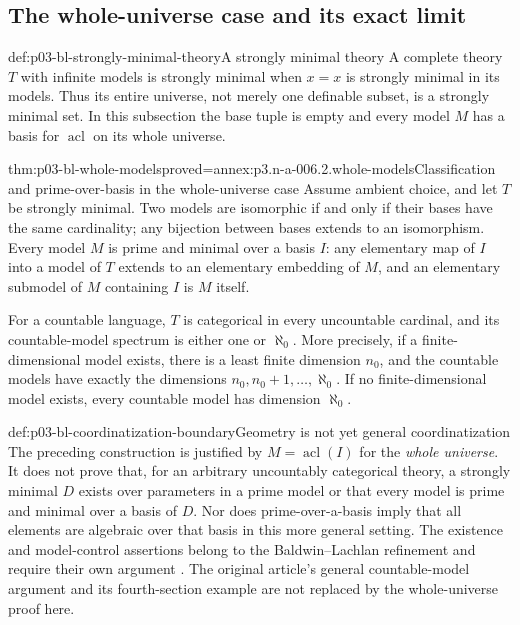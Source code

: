 \subsection{The whole-universe case and its exact limit}

\begin{hbdefinition}{def:p03-bl-strongly-minimal-theory}{A strongly minimal theory}
A complete theory \(T\) with infinite models is strongly minimal when
\(x=x\) is strongly minimal in its models. Thus its entire universe, not
merely one definable subset, is a strongly minimal set. In this subsection
the base tuple is empty and every model \(M\) has a basis for
\(\operatorname{acl}\) on its whole universe.
\end{hbdefinition}

\begin{hbtheorem}{thm:p03-bl-whole-models}{proved=annex:p3.n-a-006.2.whole-models}{Classification and prime-over-basis in the whole-universe case}
Assume ambient choice, and let \(T\) be strongly minimal. Two models are isomorphic if and only if
their bases have the same cardinality; any bijection between bases extends
to an isomorphism. Every model \(M\) is prime and minimal over a basis
\(I\): any elementary map of \(I\) into a model of \(T\) extends to an
elementary embedding of \(M\), and an elementary submodel of \(M\)
containing \(I\) is \(M\) itself.

For a countable language, \(T\) is categorical in every uncountable
cardinal, and its countable-model spectrum is either one or \(\aleph_0\).
More precisely, if a finite-dimensional model exists, there is a least
finite dimension \(n_0\), and the countable models have exactly the
dimensions \(n_0,n_0+1,\ldots,\aleph_0\). If no finite-dimensional model
exists, every countable model has dimension \(\aleph_0\).
\end{hbtheorem}

\begin{proofboundary}{def:p03-bl-coordinatization-boundary}{Geometry is not yet general coordinatization}
The preceding construction is justified by
\(M=\operatorname{acl}(I)\) for the \emph{whole universe}. It does not
prove that, for an arbitrary uncountably categorical theory, a strongly
minimal \(D\) exists over parameters in a prime model or that every model
is prime and minimal over a basis of \(D\). Nor does prime-over-a-basis
imply that all elements are algebraic over that basis in this more general
setting. The existence and model-control assertions belong to the
Baldwin--Lachlan refinement and require their own argument
\cite{BaldwinLachlan1971}. The original article's general countable-model
argument and its fourth-section example are not replaced by the
whole-universe proof here.
\end{proofboundary}

